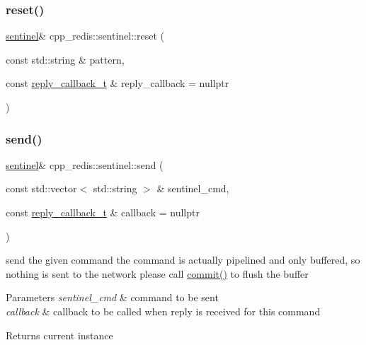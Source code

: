 \mbox{\label{classcpp__redis_1_1sentinel_a11d5f170474aa881df3b6f3cbbde3569}} 
\subsubsection{\texorpdfstring{reset()}{reset()}}
{\footnotesize\ttfamily \hyperlink{classcpp__redis_1_1sentinel}{sentinel}\& cpp\+\_\+redis\+::sentinel\+::reset (\begin{DoxyParamCaption}\item[{const std\+::string \&}]{pattern,  }\item[{const \hyperlink{classcpp__redis_1_1sentinel_ae1a150ff8787208c47414397a061c9a7}{reply\+\_\+callback\+\_\+t} \&}]{reply\+\_\+callback = {\ttfamily nullptr} }\end{DoxyParamCaption})}

\mbox{\label{classcpp__redis_1_1sentinel_a0df522dbd7debda4e73f616a62d6f5ee}} 
\subsubsection{\texorpdfstring{send()}{send()}}
{\footnotesize\ttfamily \hyperlink{classcpp__redis_1_1sentinel}{sentinel}\& cpp\+\_\+redis\+::sentinel\+::send (\begin{DoxyParamCaption}\item[{const std\+::vector$<$ std\+::string $>$ \&}]{sentinel\+\_\+cmd,  }\item[{const \hyperlink{classcpp__redis_1_1sentinel_ae1a150ff8787208c47414397a061c9a7}{reply\+\_\+callback\+\_\+t} \&}]{callback = {\ttfamily nullptr} }\end{DoxyParamCaption})}

send the given command the command is actually pipelined and only buffered, so nothing is sent to the network please call \hyperlink{classcpp__redis_1_1sentinel_ad4f85d486499f82225b244f85091b31e}{commit()} to flush the buffer


\begin{DoxyParams}{Parameters}
{\em sentinel\+\_\+cmd} & command to be sent \\
\hline
{\em callback} & callback to be called when reply is received for this command \\
\hline
\end{DoxyParams}
\begin{DoxyReturn}{Returns}
current instance 
\end{DoxyReturn}
\mbox{\label{classcpp__redis_1_1sentinel_a38436712626f27867ecff225eed87a7f}} 
